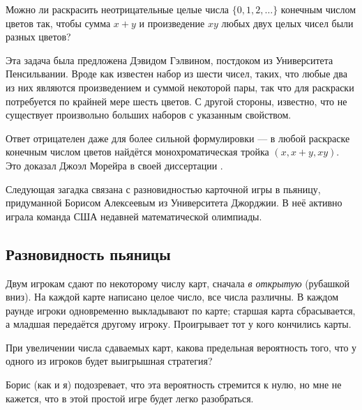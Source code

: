Можно ли раскрасить неотрицательные целые числа $\{0,1,2,\dots\}$ конечным числом цветов так, чтобы сумма $x+y$ и произведение $xy$ любых двух целых чисел были разных цветов?

\medskip

Эта задача была предложена Дэвидом Гэлвином, постдоком из Университета Пенсильвании.
Вроде как известен набор из шести чисел, таких, что любые два из них являются произведением и суммой некоторой пары, так что для раскраски потребуется по крайней мере шесть цветов.
С другой стороны, известно, что не существует произвольно больших наборов с указанным свойством.

\begin{addedbytheeditors}
Ответ отрицателен даже для более сильной формулировки --- в любой раскраске конечным числом цветов найдётся монохроматическая тройка $(x,x+y,xy)$.
Это доказал Джоэл Морейра в своей диссертации \cite{moreira}.
\pr
\end{addedbytheeditors}


\medskip

Следующая загадка связана с разновидностью карточной игры в пьяницу, придуманной Борисом Алексеевым из Университета Джорджии.
В неё активно играла команда США недавней математической олимпиады.

\subsection*{Разновидность пьяницы}

Двум игрокам сдают по некоторому числу карт, сначала \emph{в открытую} (рубашкой вниз).
На каждой карте написано целое число, все числа различны.
В каждом раунде игроки одновременно выкладывают по карте;
старшая карта сбрасывается, а младшая передаётся другому игроку.
Проигрывает тот у кого кончились карты.

При увеличении числа сдаваемых карт,
какова предельная вероятность того, что у одного из игроков будет выигрышная стратегия?

\medskip

Борис (как и я) подозревает, что эта вероятность стремится к нулю,
но мне не кажется, что в этой простой игре будет легко разобраться.


